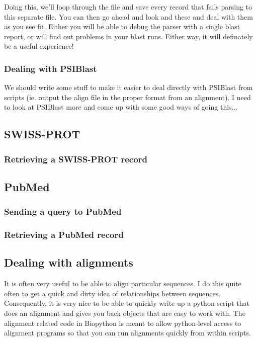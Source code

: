 \documentclass{article}
\begin{document}
Doing this, we'll loop through the file and save every record that fails parsing to this separate file. You can then go ahead and look and these and deal with them as you see fit. Either you will be able to debug the parser with a single blast report, or will find out problems in your blast runs. Either way, it will definately be a useful experience!

\subsubsection{Dealing with PSIBlast}

We should write some stuff to make it easier to deal directly with PSIBlast from scripts (ie. output the align file in the proper format from an alignment). I need to look at PSIBlast more and come up with some good ways of going this...

\subsection{SWISS-PROT}

\subsubsection{Retrieving a SWISS-PROT record}

\subsection{PubMed}

\subsubsection{Sending a query to PubMed}

\subsubsection{Retrieving a PubMed record}

\subsection{Dealing with alignments}

It is often very useful to be able to align particular sequences. I do this quite often to get a quick and dirty idea of relationships between sequences. Consequently, it is very nice to be able to quickly write up a python script that does an alignment and gives you back objects that are easy to work with. The alignment related code in Biopython is meant to allow python-level access to alignment programs so that you can run alignments quickly from within scripts.
\end{document}
